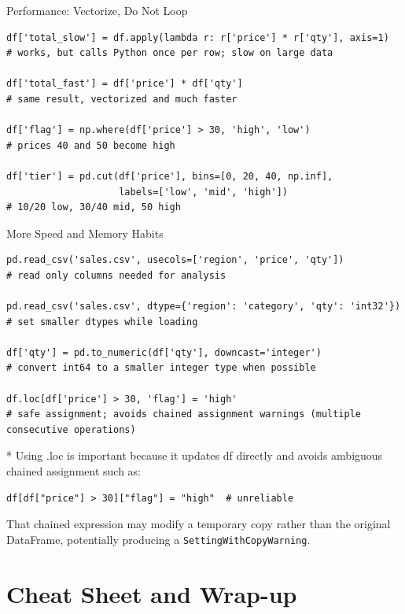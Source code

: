 \documentclass[11pt,aspectratio=43]{beamer}
\begin{document}
\begin{frame}[fragile]{Performance: Vectorize, Do Not Loop}
  \begin{lstlisting}
df['total_slow'] = df.apply(lambda r: r['price'] * r['qty'], axis=1)
# works, but calls Python once per row; slow on large data

df['total_fast'] = df['price'] * df['qty']
# same result, vectorized and much faster

df['flag'] = np.where(df['price'] > 30, 'high', 'low')
# prices 40 and 50 become high

df['tier'] = pd.cut(df['price'], bins=[0, 20, 40, np.inf],
                    labels=['low', 'mid', 'high'])
# 10/20 low, 30/40 mid, 50 high
  \end{lstlisting}
\end{frame}

\begin{frame}[fragile]{More Speed and Memory Habits}
  \begin{lstlisting}
pd.read_csv('sales.csv', usecols=['region', 'price', 'qty'])
# read only columns needed for analysis

pd.read_csv('sales.csv', dtype={'region': 'category', 'qty': 'int32'})
# set smaller dtypes while loading

df['qty'] = pd.to_numeric(df['qty'], downcast='integer')
# convert int64 to a smaller integer type when possible

df.loc[df['price'] > 30, 'flag'] = 'high'
# safe assignment; avoids chained assignment warnings (multiple consecutive operations)
  \end{lstlisting}

\tiny
* Using .loc is important because it updates df directly and avoids ambiguous chained assignment such as:

  \begin{lstlisting}
df[df["price"] > 30]["flag"] = "high"  # unreliable
  \end{lstlisting}
  
That chained expression may modify a temporary copy rather than the original DataFrame, potentially producing a \texttt{SettingWithCopyWarning}.  

\end{frame}

\section{Cheat Sheet and Wrap-up}
\end{document}
